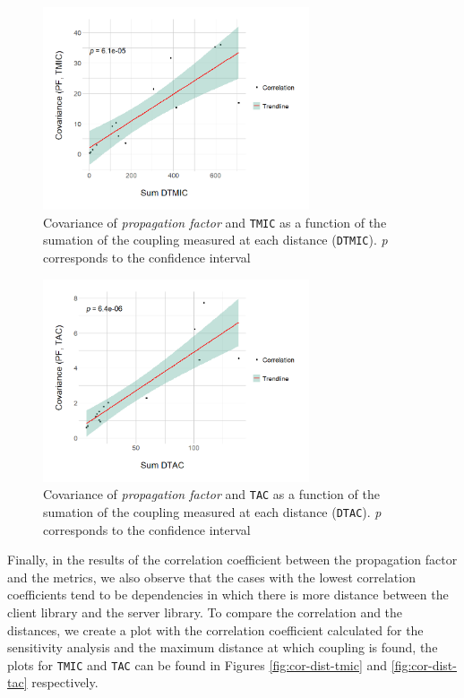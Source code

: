 \begin{figure}[ht!]
\begin{center}
\includegraphics[width=0.7\textwidth]{figures/results/covariance-values-tmic.png}
\caption{Covariance of \textit{propagation factor} and \texttt{TMIC} as a function of the sumation of the coupling measured at each distance (\texttt{DTMIC}). \textit{p} corresponds to the confidence interval}
\label{fig:cov-value-tmic}
\end{center}
\end{figure}

\begin{figure}[ht!]
\begin{center}
\includegraphics[width=0.7\textwidth]{figures/results/covariance-values-tac.png}
\caption{Covariance of \textit{propagation factor} and \texttt{TAC} as a function of the sumation of the coupling measured at each distance (\texttt{DTAC}). \textit{p} corresponds to the confidence interval}
\label{fig:cov-value-tac}
\end{center}
\end{figure}

Finally, in the results of the correlation coefficient between the propagation factor and the metrics, we also observe that the cases with the lowest correlation coefficients tend to be dependencies in which there is more distance between the client library and the server library. To compare the correlation and the distances, we create a plot with the correlation coefficient calculated for the sensitivity analysis and the maximum distance at which coupling is found, the plots for \texttt{TMIC} and \texttt{TAC} can be found in Figures \ref{fig:cor-dist-tmic} and \ref{fig:cor-dist-tac} respectively.

